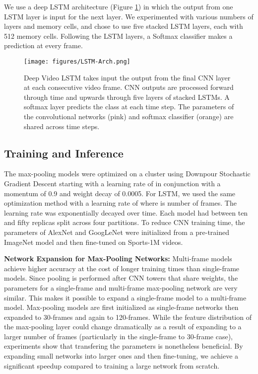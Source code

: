 \documentclass[10pt,twocolumn,letterpaper]{article}
\begin{document}
\label{subsec:lstm-arch}
We use a deep LSTM architecture \cite{graves13speech} (Figure
\ref{fig:lstm-arch}) in which the output from one LSTM layer is input
for the next layer. We experimented with various numbers of layers
and memory cells, and chose to use five stacked LSTM layers, each
with 512 memory cells. Following the LSTM layers, a Softmax classifier
makes a prediction at every frame.

\begin{figure}[ht]
\begin{center}
\texttt{[image: figures/LSTM-Arch.png]}
\end{center}
\caption{Deep Video LSTM takes input the output from the final CNN
  layer at each consecutive video frame. CNN outputs are processed
  forward through time and upwards through five layers of stacked
  LSTMs. A softmax layer predicts the class at each time step.
  The parameters of the convolutional networks (pink) and softmax
  classifier (orange) are shared across time steps.}
\label{fig:lstm-arch}
\end{figure}


\vspace{-.6em}
\subsection{Training and Inference}
\vspace{-.6em}
\label{subsec:training}
The max-pooling models were optimized on a cluster using Downpour Stochastic Gradient Descent
starting with a learning rate of  in conjunction with a momentum of 0.9 and weight decay of 0.0005.
For LSTM, we used the same optimization method with a learning rate of  where  is number of frames.  The learning rate was exponentially
decayed over time. Each model had between ten and fifty replicas split across
four partitions. To reduce CNN training time, the parameters of AlexNet and
GoogLeNet were initialized from a pre-trained ImageNet model and then
fine-tuned on Sports-1M videos.

\textbf{Network Expansion for Max-Pooling Networks:}
\label{subsec:expansion}
Multi-frame models achieve higher accuracy at the cost of longer
training times than single-frame models.
Since pooling is performed after CNN towers that
share weights, the parameters for a single-frame and multi-frame
max-pooling network are very similar.
This makes it possible to expand a single-frame model to a
multi-frame model. Max-pooling models are first
initialized as single-frame networks then expanded to 30-frames and
again to 120-frames. While the feature distribution of the max-pooling
layer could change dramatically as a result of expanding to a larger
number of frames (particularly in the single-frame to 30-frame case),
experiments show that transfering the parameters is nonetheless
beneficial. By expanding small networks into larger ones and then
fine-tuning, we achieve a significant speedup compared to training a
large network from scratch.
\end{document}
